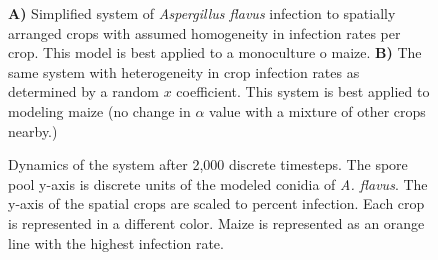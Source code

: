 \documentclass[a4paper,12pt]{article}
\begin{document}
\begin{figure}[h!]
  \noindent
  \caption{\textbf{A)} Simplified system of \emph{Aspergillus flavus} infection to spatially arranged crops with assumed homogeneity in infection rates per crop. This model is best applied to a monoculture o maize. \textbf{B)} The same system with heterogeneity in crop infection rates as determined by a random $x$ coefficient. This system is best applied to modeling maize (no change in $\alpha$ value with a mixture of other crops nearby.)}
\end{figure}

\newpage

\begin{figure}[h!t]
  \noindent
  \caption{Dynamics of the system after 2,000 discrete timesteps. The spore pool y-axis is discrete units of the modeled conidia of \emph{A. flavus}. The y-axis of the spatial crops are scaled to percent infection. Each crop is represented in a different color. Maize is represented as an orange line with the highest infection rate.}
\end{figure}
\end{document}
